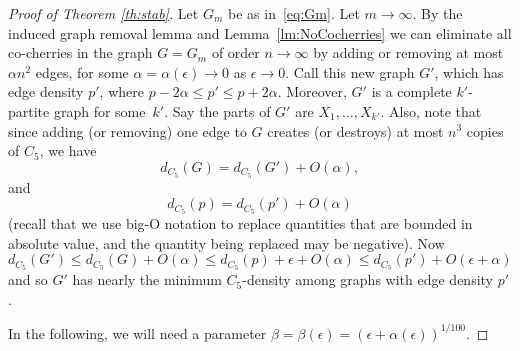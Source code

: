 \documentclass[12pt]{article}
\newcommand{\eps}{\epsilon}
\renewcommand{\a}{\alpha}
\renewcommand{\b}{\beta}
\theoremstyle{definition}
\theoremstyle{remark}
\renewcommand{\leq}{\leqslant}
\renewcommand{\le}{\leqslant}
\begin{document}
\begin{proof}[Proof of Theorem \ref{th:stab}] Let $G_m$ be as in~\eqref{eq:Gm}. Let $m\to\infty$.
By the induced graph removal lemma and Lemma~\ref{lm:NoCocherries}
we can eliminate all co-cherries in the graph $G=G_m$ of order $n\to\infty$ by adding or removing at most $\a n^2$ edges, for some $\a = \a(\eps) \rightarrow 0$  as $\eps\rightarrow 0$. Call this new graph $G'$, which has edge density $p'$, where $p - 2\a \leq p' \leq p+2\a$.  Moreover, $G'$ is a complete $k'$-partite graph for some~$k'$. Say the parts of $G'$ are $X_1, \ldots,X_{k'}$.
Also, note that since adding (or removing) one edge to $G$ creates (or destroys) at most $n^3$ copies of $C_5$, we have
\[
d_{C_5} (G) = d_{C_5} (G') + O(\a),
\] 
and 
\[
d_{C_5}(p)  =  d_{C_5}(p')+O(\a)
\]
(recall that we use big-O notation to replace quantities that are bounded in absolute value, and the quantity being replaced may be negative). Now 
\begin{equation}\label{eq:dupper}
d_{C_5}(G') \le d_{C_5}(G) + O(\a) \le d_{C_5}(p)+ \eps  + O(\a) \le d_{C_5}(p')+  O(\eps + \a)
\end{equation}
and so $G'$ has nearly the minimum  $C_5$-density among graphs with edge density $p'$. 

In the following, we will need  a parameter $\b = \b(\eps) = (\eps+\a(\eps))^{1/100}$. 


\end{proof}
\end{document}
